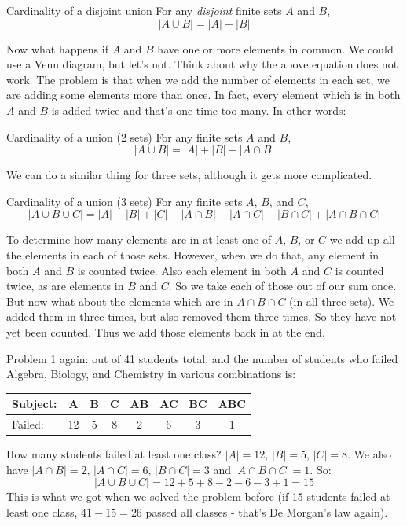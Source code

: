 \documentclass[12pt]{article}
\begin{document}
\begin{defbox}{Cardinality of a disjoint union}
  For any {\em disjoint} finite sets $A$ and $B$,
  \[|A \cup B| = |A| + |B|\]
\end{defbox}

Now what happens if $A$ and $B$ have one or more elements in common.  We could use a Venn diagram, but let's not.  Think about why the above equation does not work.  The problem is that when we add the number of elements in each set, we are adding some elements more than once.  In fact, every element which is in both $A$ and $B$ is added twice and that's one time too many.  In other words:

\begin{defbox}{Cardinality of a union (2 sets)}
  For any finite sets $A$ and $B$,
  \[|A \cup B| = |A| + |B| - |A \cap B|\]
\end{defbox}

We can do a similar thing for three sets, although it gets more complicated.

\begin{defbox}{Cardinality of a union (3 sets)}
  For any finite sets $A$, $B$, and $C$,
  \[|A \cup B \cup C| = |A| + |B| + |C| - |A \cap B| - |A \cap C| - |B \cap C| + |A \cap B \cap C|\]
\end{defbox}

To determine how many elements are in at least one of $A$, $B$, or $C$ we add up all the elements in each of those sets.  However, when we do that, any element in both $A$ and $B$ is counted twice.  Also each element in both $A$ and $C$ is counted twice, as are elements in $B$ and $C$.  So we take each of those out of our sum once.  But now what about the elements which are in $A \cap B \cap C$ (in all three sets).  We added them in three times, but also removed them three times.  So they have not yet been counted.  Thus we add those elements back in at the end.

\begin{example}
  Problem 1 again: out of 41 students total, and the number of students who failed Algebra, Biology, and Chemistry in various combinations is: 

\begin{center}
\begin{tabular}{|l|c|c|c|c|c|c|c|}
\hline
 Subject: & A & B & C & AB & AC & BC & ABC\\
\hline
Failed: & 12 & 5 & 8 & 2 & 6 & 3 & 1\\
\hline
\end{tabular}
\end{center}

How many students failed at least one class?  $|A| = 12$, $|B| = 5$, $|C| = 8$.  We also have $|A \cap B| = 2$, $|A \cap C| = 6$, $|B \cap C| = 3$ and $|A \cap B \cap C| = 1$.  So:
\[|A \cup B \cup C| = 12 + 5 + 8 - 2 - 6 - 3 + 1 = 15\]
This is what we got when we solved the problem before (if 15 students failed at least one class, $41-15 = 26$ passed all classes - that's De Morgan's law again).
\end{example}
\end{document}
